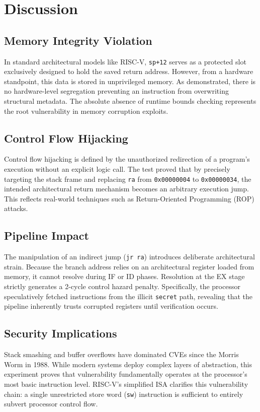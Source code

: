 \chapter{Discussion}

\section{Memory Integrity Violation}
In standard architectural models like RISC-V, \texttt{sp+12} serves as a protected slot exclusively designed to hold the saved return address. However, from a hardware standpoint, this data is stored in unprivileged memory. As demonstrated, there is no hardware-level segregation preventing an instruction from overwriting structural metadata. The absolute absence of runtime bounds checking represents the root vulnerability in memory corruption exploits.

\section{Control Flow Hijacking}
Control flow hijacking is defined by the unauthorized redirection of a program's execution without an explicit logic call. The test proved that by precisely targeting the stack frame and replacing \texttt{ra} from \texttt{0x00000004} to \texttt{0x00000034}, the intended architectural return mechanism becomes an arbitrary execution jump. This reflects real-world techniques such as Return-Oriented Programming (ROP) attacks.

\section{Pipeline Impact}
The manipulation of an indirect jump (\texttt{jr ra}) introduces deliberate architectural strain. Because the branch address relies on an architectural register loaded from memory, it cannot resolve during IF or ID phases. Resolution at the EX stage strictly generates a 2-cycle control hazard penalty. Specifically, the processor speculatively fetched instructions from the illicit \texttt{secret} path, revealing that the pipeline inherently trusts corrupted registers until verification occurs. 

\section{Security Implications}
Stack smashing and buffer overflows have dominated CVEs since the Morris Worm in 1988. While modern systems deploy complex layers of abstraction, this experiment proves that vulnerability fundamentally operates at the processor's most basic instruction level. RISC-V's simplified ISA clarifies this vulnerability chain: a single unrestricted store word (\texttt{sw}) instruction is sufficient to entirely subvert processor control flow.

